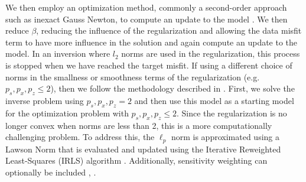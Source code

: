 \documentclass[lettersize,journal]{IEEEtran}
\begin{document}
We then employ an optimization method, commonly a second-order approach such as inexact Gauss Newton, to compute an update to the model \cite{ref5}. We then reduce $\beta$, reducing the influence of the regularization and allowing the data misfit term to have more influence in the solution and again compute an update to the model. In an inversion where $l_2$ norms are used in the regularization, this process is stopped when we have reached the target misfit. If using a different choice of norms in the smallness or smoothness terms of the regularization (e.g. $p_s, p_x, p_z \leq 2$), then we follow the methodology described in \cite{ref21}. First, we solve the inverse problem using $p_s, p_x, p_z = 2$ and then use this model as a starting model for the optimization problem with $p_s, p_x, p_z \leq 2$. Since the regularization is no longer convex when norms are less than 2, this is a more computationally challenging problem. To address this, the $\ell_p$ norm is approximated using a Lawson Norm \cite{ref60} that is evaluated and updated using the Iterative Reweighted Least-Squares (IRLS) algorithm \cite{ref21}. Additionally, sensitivity weighting can optionally be included \cite{ref51}, \cite{ref52}. 
\end{document}
